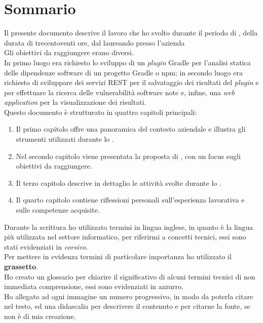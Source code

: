 \cleardoublepage
{}
{}
\begingroup
\let\clearpage\relax
\let\cleardoublepage\relax
\let\cleardoublepage\relax

\chapter*{Sommario}

Il presente documento descrive il lavoro che ho svolto durante il periodo di \stage, della durata di trecentoventi ore, 
dal laureando {\myName} presso l'azienda {\azienda} \\
Gli obiettivi da raggiungere erano diversi.\\
In primo luogo era richiesto lo sviluppo di un \textit{plugin} Gradle per l'analisi statica delle dipendenze software di un progetto Gradle o npm;
in secondo luogo era richiesto di sviluppare dei servizi REST per il salvataggio dei risultati del \textit{plugin} e per effettuare la ricerca
delle vulnerabilità software note e, infine,
una \textit{web application} per la visualizzazione dei risultati.\\
Questo documento è strutturato in quattro capitoli principali:
\begin{enumerate}
    \item Il primo capitolo offre una panoramica del contesto aziendale e illustra gli strumenti utilizzati durante lo \stage.
    \item Nel secondo capitolo viene presentata la proposta di \stage, con un focus sugli obiettivi da raggiungere.
    \item Il terzo capitolo descrive in dettaglio le attività svolte durante lo \stage.
    \item Il quarto capitolo contiene riflessioni personali sull'esperienza lavorativa e sulle competenze acquisite.
\end{enumerate}

\noindent Durante la scrittura ho utilizzato termini in lingua inglese, in quanto è la lingua più utilizzata nel settore informatico, 
per riferirmi a concetti tecnici, essi sono stati evidenziati in \textit{corsivo}.\\
Per mettere in evidenza termini di particolare importanza ho utilizzato il \textbf{grassetto}.\\
Ho creato un glossario per chiarire il significativo di alcuni termini tecnici di non immediata comprensione, essi sono evidenziati in azzurro.\\
Ho allegato ad ogni immagine un numero progressivo, in modo da poterla citare nel testo, ed una didascalia per descrivere il contenuto
e per citarne la fonte, se non è di mia creazione.\\





\endgroup

\vfill
